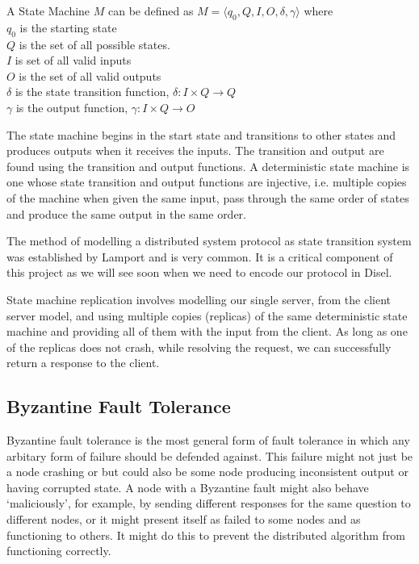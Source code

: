 A State Machine $M$ can be defined as $M = \langle q_0, Q, I, O, \delta, \gamma \rangle$ where \\
$q_0$ is the starting state \\
$Q$ is the set of all possible states. \\
$I$ is set of all valid inputs \\
$O$ is the set of all valid outputs \\
$\delta$ is the state transition function, $\delta : I \times Q \rightarrow Q$ \\
$\gamma$ is the output function, $\gamma : I \times Q \rightarrow O$

The state machine begins in the start state and transitions to other states and
produces outputs when it receives the inputs. The transition and output are found
using the transition and output functions. A deterministic state machine is one
whose state transition and output functions are injective, i.e. multiple
copies of the machine when given the same input, pass through the same order of states
and produce the same output in the same order.

The method of modelling a distributed system protocol as state transition system
was established by Lamport \cite{10} and is very common. It is a critical component
of this project as we will see soon when we need to encode our protocol in Disel.

State machine replication involves modelling our single server, from the client
server model, and using multiple copies (replicas) of the same deterministic
state machine and providing all of them with the input from the client.
As long as one of the replicas does not crash, while resolving the request,
we can successfully return a response to the client.

\subsection{Byzantine Fault Tolerance}
Byzantine fault tolerance is the most general form of fault tolerance in which
any arbitary form of failure should be defended against. This failure might not
just be a node crashing or but could also be some node producing inconsistent
output or having corrupted state. A node with a Byzantine fault might also behave
`maliciously', for example, by sending different responses for the same question to
different nodes, or it might present itself as failed to some nodes and as functioning
to others. It might do this to prevent the distributed algorithm from functioning
correctly.

